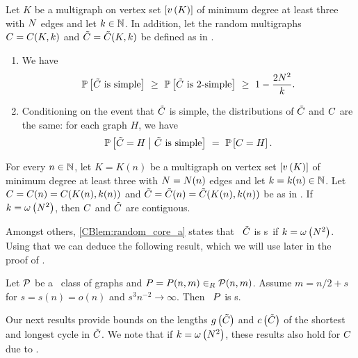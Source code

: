 \begin{lem}\label{CBlem:random_core}
Let $K$ be a multigraph on vertex set $[v\left({K}\right)]$ of minimum degree at least three with $N$ edges and let $k \in \mathbb{N}$. In addition, let the random multigraphs $C=C(K, k)$ and $\tilde{C}=\tilde{C}(K,k)$ be defined as in . 
\begin{enumerate}
	\item \label{CBlem:random_core_a}
We have 
	\[ \prob{\randomMultiCore\text{ is simple}} \ \geq\ \prob{\randomMultiCore\text{ is 2-simple}}\ \geq\ 1-\frac{2\nc^2}{\nd}.\]
	\item \label{CBlem:random_core_b}
	Conditioning on the event that $\tilde{C}$ is simple, the distributions of $\tilde{C}$ and $C$ are the same: for each graph $H$, we have
	\[
	\mathbb{P}\left[\tilde{C}=H\;\middle|\;\tilde{C}\text{ is simple}\right]\ =\ \mathbb{P}\left[C=H\right].
	\]
\end{enumerate}
\end{lem}
\begin{coro}\label{CBcor:contiguous}
For every $n \in \mathbb{N}$, let $K=K(n)$ be a multigraph on vertex set $[v\left({K}\right)]$ of minimum degree at least three with $N=N(n)$ edges and let $k=k(n) \in \mathbb{N}$. Let $C=C(n)=C(K(n),k(n))$ and $\tilde{C}=\tilde{C}(n)=\tilde{C}(K(n),k(n))$ be as in . If $k=\omega\left(N^2\right)$, then $C$ and $\tilde{C}$ are contiguous.
\end{coro}

Amongst others, \ref{CBlem:random_core_a} states that \whp\ $\tilde{C}$ is \2s\ if $k=\omega\left(N^2\right)$. Using that we can deduce the following result, which we will use later in the proof of .
\begin{coro}\label{CBcor:subdivision_twice}
Let $\mathcal{P}$ be a \pl\ class of graphs and $P=P(n,m) \in_R \mathcal {P}(n,m)$.
Assume $m=n/2+s$ for $s=s(n)=o(n)$ and $s^3n^{-2} \to \infty$. Then \whp\ $P$ is \2s.
\end{coro}

Our next results provide bounds on the lengths $g\left({\tilde{C}}\right)$ and $c\left({\tilde{C}}\right)$ of the shortest and longest cycle in $\tilde{C}$. We note that if $k=\omega\left(N^2\right)$, these results also hold for $C$ due to .

